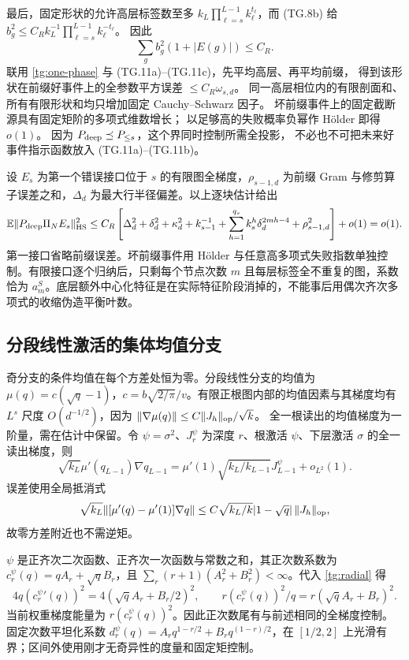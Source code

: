 \documentclass[a4paper]{tufte-handout}
\begin{document}
\begin{fullwidth}
最后，固定形状的允许高层标签数至多
$k_L\prod_{\ell=s}^{L-1}k_\ell^{t_\ell}$，而 (TG.8b) 给
$b_g^2\le C_Rk_L^{-1}\prod_{\ell=s}^{L-1}k_\ell^{-t_\ell}$。
因此
\[
 \sum_g b_g^2(1+|E(g)|)\le C_R.
 \tag{TG.11c}
\]
联用 \eqref{tg:one-phase} 与 (TG.11a)--(TG.11c)，先平均高层、再平均前缀，
得到该形状在前缀好事件上的全参数平方误差 $\le C_R\omega_{s,d}$。
同一高层相位内的有限剖面和、所有有限形状和均只增加固定 Cauchy--Schwarz 因子。
坏前缀事件上的固定截断源具有固定矩阶的多项式维数增长；
以足够高的失败概率负幂作 Hölder 即得 $o(1)$。
因为 $P_{\rm deep}\preceq P_{\le s}$，这个界同时控制所需全投影，
不必也不可把未来好事件指示函数放入 (TG.11a)--(TG.11b)。

设 $E_s$ 为第一个错误接口位于 $s$ 的有限图全梯度，$\rho_{s-1,d}$ 为前缀 Gram 与修剪算子误差之和，$\Delta_d$ 为最大行半径偏差。以上逐块估计给出
\begin{equation}\label{tg:separator}
 \mathbb E\|P_{\rm deep}\Pi_NE_s\|_{\rm HS}^2
 \le C_R\left[\Delta_d^2+\delta_d^2+\kappa_d^2+k_{s-1}^{-1}
 +\sum_{h=1}^{q_s}k_s^h\delta_d^{2mh-4}+\rho_{s-1,d}^2\right]+o(1)=o(1).
\end{equation}
第一接口省略前缀误差。坏前缀事件用 Hölder 与任意高多项式失败指数单独控制。有限接口逐个归纳后，只剩每个节点次数 $m$ 且每层标签全不重复的图，系数恰为 $a_m^S$。底层额外中心化特征是在实际特征阶段消掉的，不能事后用偶次齐次多项式的收缩伪造平衡叶数。

\subsection{分段线性激活的集体均值分支}
奇分支的条件均值在每个方差处恒为零。分段线性分支的均值为
$\mu(q)=c(\sqrt q-1)$，$c=b\sqrt{2/\pi}/v$。有限正根图内部的均值因素与其梯度均有 $L^s$ 尺度 $O(d^{-1/2})$，因为
$\|\nabla\mu(q)\|\le C\|J_h\|_{\rm op}/\sqrt k$。
全一根读出的均值梯度为一阶量，需在估计中保留。令 $\psi=\sigma^2$、$J_r^\psi$ 为深度 $r$、根激活 $\psi$、下层激活 $\sigma$ 的全一读出梯度，则
\[
 \sqrt{k_L}\mu'(q_{L-1})\nabla q_{L-1}
 =\mu'(1)\sqrt{k_L/k_{L-1}}J_{L-1}^\psi+o_{L^2}(1).\tag{TG.12}
\]
误差使用全局抵消式
\[
 \sqrt{k_L}\|[\mu'(q)-\mu'(1)]\nabla q\|
 \le C\sqrt{k_L/k}|1-\sqrt q|\,\|J_h\|_{\rm op},
\]
故零方差附近也不需逆矩。

$\psi$ 是正齐次二次函数、正齐次一次函数与常数之和，其正次数系数为
$c_r^\psi(q)=qA_r+\sqrt qB_r$，且
$\sum_r(r+1)(A_r^2+B_r^2)<\infty$。代入 \eqref{tg:radial} 得
\[
 4q(c_r^\psi{}'(q))^2=4(\sqrt qA_r+B_r/2)^2,\qquad
 r(c_r^\psi(q))^2/q=r(\sqrt qA_r+B_r)^2.
\]
当前权重梯度能量为 $r(c_r^\psi(q))^2$。因此正次数尾有与前述相同的全梯度控制。固定次数平坦化系数
$d_r^\psi(q)=A_rq^{1-r/2}+B_rq^{(1-r)/2}$，在 $[1/2,2]$ 上光滑有界；区间外使用刚才无奇异性的度量和固定矩控制。


\end{fullwidth}
\end{document}
